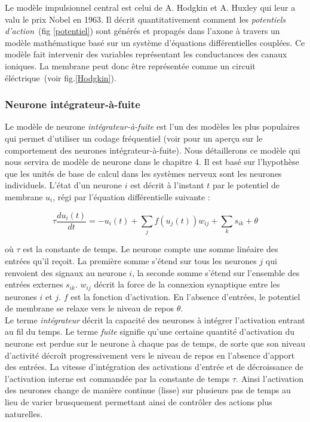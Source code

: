 Le modèle impulsionnel central est celui de A. Hodgkin et A. Huxley \cite{Hodgkin:1952} qui leur a valu le prix Nobel en 1963. Il décrit quantitativement comment les \textit{potentiels d'action}~(fig \ref{potentiel}) sont générés et propagés dans l'axone à travers un modèle mathématique basé sur un système d'équations différentielles couplées. Ce modèle fait intervenir des variables représentant les conductances des canaux ioniques. La membrane peut donc être représentée comme un circuit éléctrique~(voir fig.\ref{Hodgkin}).\\



\subsubsection {Neurone intégrateur-à-fuite}

Le modèle de neurone \textit{intégrateur-à-fuite} est l'un des modèles les plus populaires qui permet d'utiliser un codage fréquentiel (voir \cite{Blynel:2002} pour un aperçu sur le comportement des neurones intégrateur-à-fuite). Nous détaillerons ce modèle qui nous servira de modèle de neurone dans le chapitre 4. Il est basé sur l'hypothèse que les unités de base de calcul dans les systèmes nerveux sont les neurones individuels. L'état d'un neurone $i$ est décrit à l'instant $t$ par le potentiel de membrane $u_i$, régi par l'équation différentielle suivante :

\begin{center}
\begin{equation} 
\tau\frac{du_i(t)}{dt}= -u_i(t)+\sum_j {f(u_j(t))w_{ij}} + \sum_k {s_{ik}} +\theta
 \end{equation}
\end{center}

o\`u $\tau$ est la constante de temps. Le neurone compte une somme linéaire des entrées qu'il reçoit. La première somme s'étend sur tous les neurones $j$ qui renvoient des signaux au neurone $i$, la seconde somme s'étend sur l'ensemble des entrées externes $s_{ik}$. $w_{ij}$ décrit la force de la connexion synaptique entre les neurones $i$ et $j$. $f$ est la fonction d'activation. En l'absence d'entrées, le potentiel de membrane se relaxe vers le niveau de repos $\theta$.\\

Le terme \textit{intégrateur} décrit la capacité des neurones à intégrer l'activation entrant au fil du temps. Le terme \textit{fuite} signifie qu'une certaine quantité d'activation du neurone est perdue sur le neurone à chaque pas de temps, de sorte que son niveau d'activité décroît progressivement vers le niveau de repos en l'absence d'apport des entrées. La vitesse d'intégration des activations d'entrée et de décroissance de l'activation interne est commandée par la constante de temps $\tau$. Ainsi l'activation des neurones change de manière continue (lisse) sur plusieurs pas de temps au lieu de varier brusquement permettant ainsi de contrôler des actions plus naturelles.\\

